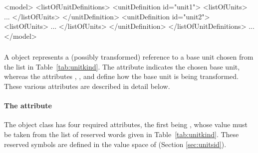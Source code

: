 \begin{example}

<model>
    <listOfUnitDefinitions>
        <unitDefinition id="unit1">
            <listOfUnits>
                ...
            </listOfUnits>
        </unitDefinition>
        <unitDefinition id="unit2">
            <listOfUnits>
                ...
            </listOfUnits>
        </unitDefinition>
    </listOfUnitDefinitions>
    ...
</model>
\end{example}


\subsubsection{}
\label{sec:unit-structure}

A \Unit object represents a (possibly transformed) reference to
a base unit chosen from the list in
  Table~\vref{tab:unitkind}.  The attribute
 indicates the chosen base unit, whereas the
attributes , , and
 define how the base unit is being transformed.
These various attributes are described in detail below.


\paragraph{The  attribute}



The \Unit object class has four required attributes, the first being
, whose value must be taken from the list of reserved
words given in Table~\vref{tab:unitkind}.  These reserved
symbols are defined in the value space of 
(Section \ref{sec:unitsid}).

